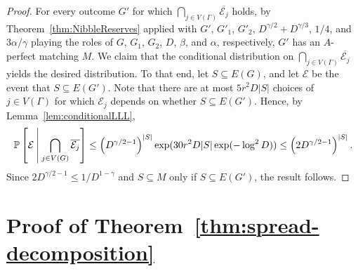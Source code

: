 \documentclass[11pt]{article}
\numberwithin{equation}{section}
\newcounter{i}
\theoremstyle{plain}
\theoremstyle{plain} %
\theoremstyle{definition}
\newcommand{\cE}{\mathcal{E}}
\newcommand{\cG}{\mathcal{G}}
\newcommand{\ProbCond}[2]{\ensuremath{%
    \mathbb P\left[#1\:\middle|\:#2\right]
  }}
\def\COMMENT#1{}
\begin{document}
\begin{proof}
  For every outcome $G'$ for which $\bigcap_{j \in V(\Gamma)}\overline{\cE_j}$ holds, by Theorem~\ref{thm:NibbleReserves} applied with $G'$, $G'_1$, $G'_2$, $D^{\gamma / 2} + D^{\gamma/3}$, $1/4$, and $3\alpha / \gamma$ playing the roles of $G$, $G_1$, $G_2$, $D$, $\beta$, and $\alpha$, respectively\COMMENT{
  \begin{itemize}
  \item $(D^{\gamma/2} + D^{\gamma/3})^{1 - 1/4} \geq \log^2 D$, so the codegrees are small enough;
  \item $(D^{\gamma/2} + D^{\gamma/3})^{1 - 3\alpha/\gamma} \leq D^{\gamma/2 - \alpha} - D^{\gamma/3}$, so degrees of vertices in $A$ are large enough in $\cG'_2$;
  \item Since
  \begin{align*}
      D^{\gamma/2} + D^{\gamma/3} - (D^{\gamma/2} + D^{\gamma/3})^{1-1/4} &\leq D^{\gamma/2} - D^{\gamma/3} &\text{iff}\\
      2D^{\gamma/3} &\leq (D^{\gamma/2} + D^{\gamma/3})^{3/4},
  \end{align*}
  we have $(D^{\gamma/2} + D^{\gamma/3})(1 - (D^{\gamma/2} + D^{\gamma/3})^{-1/4}) \leq D^{\gamma/2}(1 - D^{-\gamma/6})$, so degrees of vertices in $A$ are large enough in $\cG'_1$;  
  \end{itemize}
  }, $G'$ has an $A$-perfect matching $M$.
  We claim that the conditional distribution on $\bigcap_{j \in V(\Gamma)}\overline{\cE_j}$ yields the desired distribution.
  To that end, let $S \subseteq E(G)$, and let $\cE$ be the event that $S \subseteq E(G')$.  Note that there are at most $5r^2 D|S|$ choices of $j \in V(\Gamma)$ for which $\cE_j$ depends on whether $S \subseteq E(G')$.  Hence, by Lemma~\ref{lem:conditionalLLL},      
  \begin{equation*}
    \ProbCond{\cE}{\bigcap_{j \in V(G)}\overline{\cE_j}} \leq \left(D^{\gamma/2 - 1}\right)^{|S|}\exp(30r^2 D|S|\exp(-\log^2 D)) \leq \left(2D^{\gamma/2 - 1}\right)^{|S|}.
  \end{equation*}
  Since $2D^{\gamma/2 - 1} \leq 1 / D^{1 - \gamma}$ and $S\subseteq M$ only if $S \subseteq E(G')$, the result follows.
\end{proof}


\section{Proof of Theorem~\ref{thm:spread-decomposition}}\label{s:MainProof}
\end{document}
